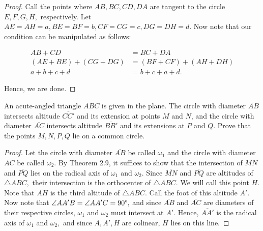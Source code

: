 \documentclass[letterpaper,oneside]{scrartcl}
\begin{document}
\begin{proof}  Call the points where $AB, BC, CD, DA$ are tangent to the circle $E, F, G, H,$ respectively. Let $AE = AH = a, BE = BF = b, CF = CG = c, DG = DH = d.$ Now note that our condition can be manipulated as follows:

  \begin{align*}
    AB + CD               & = BC + DA               \\
    (AE + BE) + (CG + DG) & = (BF + CF) + (AH + DH) \\
    a + b + c + d         & = b + c + a + d.
  \end{align*}

  Hence, we are done.
\end{proof}

\begin{problem*}
  [2.26, USAMO 1990/5]
  An acute-angled triangle $ABC$ is given in the plane. The circle with diameter $\overline{AB}$ intersects altitude $\overline{CC'}$ and its extension at points $M$ and $N$, and the circle with diameter $\overline{AC}$ intersects altitude $\overline{BB'}$ and its extensions at $P$ and $Q$. Prove that the points $M, N, P , Q$ lie on a common circle.
\end{problem*}

\begin{proof}  Let the circle with diameter $\overline{AB}$ be called $\omega_1$ and the circle with diameter $\overline{AC}$ be called $\omega_2.$  By Theorem 2.9, it suffices to show that the intersection of $\overline{MN}$ and $\overline{PQ}$ lies on the radical axis of $\omega_1$ and $\omega_2.$ Since $\overline{MN}$ and $\overline{PQ}$ are altitudes of $\triangle ABC,$ their intersection is the orthocenter of $\triangle ABC.$ We will call this point $H.$ Note that $\overline{AH}$ is the third altitude of $\triangle ABC.$ Call the foot of this altitude $A'.$ Now note that $\angle AA'B = \angle AA'C = 90\degree,$ and since $\overline{AB}$ and $\overline{AC}$ are diameters of their respective circles, $\omega_1$ and $\omega_2$ must intersect at $A'.$ Hence, $\overline{AA'}$ is the radical axis of $\omega_1$ and $\omega_2,$ and since $A,A',H$ are colinear, $H$ lies on this line. \end{proof}
\end{document}

